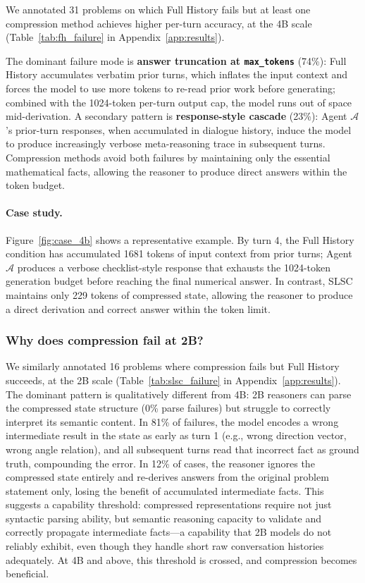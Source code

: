 We annotated 31 problems on which Full History fails but at least one compression method achieves higher per-turn accuracy, at the 4B scale (Table~\ref{tab:fh_failure} in Appendix~\ref{app:results}).

The dominant failure mode is \textbf{answer truncation at \texttt{max\_tokens}} (74\%): Full History accumulates verbatim prior turns, which inflates the input context and forces the model to use more tokens to re-read prior work before generating; combined with the 1024-token per-turn output cap, the model runs out of space mid-derivation. A secondary pattern is \textbf{response-style cascade} (23\%): Agent $\mathcal{A}$'s prior-turn responses, when accumulated in dialogue history, induce the model to produce increasingly verbose meta-reasoning trace in subsequent turns. Compression methods avoid both failures by maintaining only the essential mathematical facts, allowing the reasoner to produce direct answers within the token budget.

\paragraph{Case study.}
Figure~\ref{fig:case_4b} shows a representative example. By turn 4, the Full History condition has accumulated 1681 tokens of input context from prior turns; Agent $\mathcal{A}$ produces a verbose checklist-style response that exhausts the 1024-token generation budget before reaching the final numerical answer. In contrast, SLSC maintains only 229 tokens of compressed state, allowing the reasoner to produce a direct derivation and correct answer within the token limit.

\subsubsection{Why does compression fail at 2B?}
\label{sec:slsc_2b_failure}

We similarly annotated 16 problems where compression fails but Full History succeeds, at the 2B scale (Table~\ref{tab:slsc_failure} in Appendix~\ref{app:results}). The dominant pattern is qualitatively different from 4B: 2B reasoners can parse the compressed state structure (0\% parse failures) but struggle to correctly interpret its semantic content. In 81\% of failures, the model encodes a wrong intermediate result in the state as early as turn 1 (e.g., wrong direction vector, wrong angle relation), and all subsequent turns read that incorrect fact as ground truth, compounding the error. In 12\% of cases, the reasoner ignores the compressed state entirely and re-derives answers from the original problem statement only, losing the benefit of accumulated intermediate facts. This suggests a capability threshold: compressed representations require not just syntactic parsing ability, but semantic reasoning capacity to validate and correctly propagate intermediate facts---a capability that 2B models do not reliably exhibit, even though they handle short raw conversation histories adequately. At 4B and above, this threshold is crossed, and compression becomes beneficial.

